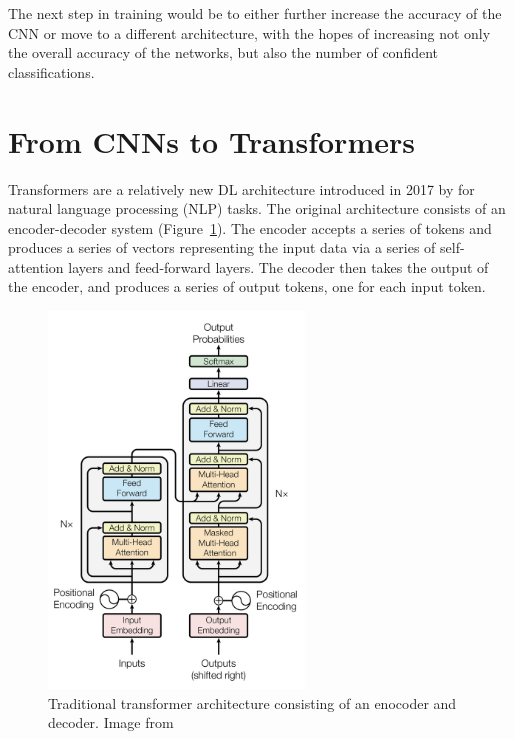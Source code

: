 The next step in training would be to either further increase the accuracy of the CNN 
or move to a different architecture, with the hopes of increasing not only 
the overall accuracy of the networks, but also the number of confident classifications.

\section{From CNNs to Transformers}\label{sec:transformers}
Transformers are a relatively new DL architecture introduced in 2017 by \textcite{vaswani2017}
for natural language processing (NLP) tasks. The original architecture consists of 
an encoder-decoder system (Figure~\ref{fig:transformer_orig}). The encoder accepts a series of tokens and produces a series of vectors
representing the input data via a series 
of self-attention layers and feed-forward layers. The decoder then takes the output of the encoder, and
produces a series of output tokens, one for each input token. 

\begin{figure}[ht]
    \centering
    \includegraphics[height=10cm]{figures/transformer_paper/Transformer_Original.png}
    \caption[Transformer Architecture]{Traditional transformer architecture consisting of an enocoder and decoder. 
        Image from \textcite{vaswani2017}
    \label{fig:transformer_orig}}
\end{figure}

